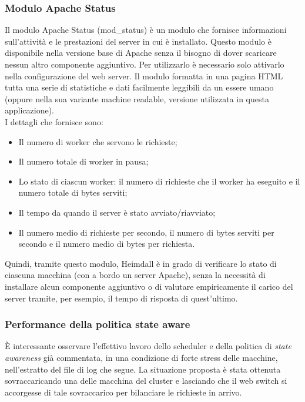 \documentclass[italian]{tktltiki2}
\begin{document}
\subsubsection{Modulo Apache Status}
\label{sssec:apachestatus}
Il modulo Apache Status (mod\_status)\cite{mod_status} è un modulo che fornisce informazioni sull'attività e le prestazioni del server in cui è installato. Questo modulo è disponibile nella versione base di Apache senza il bisogno di dover scaricare nessun altro componente aggiuntivo. Per utilizzarlo è necessario solo attivarlo nella configurazione del web server. Il modulo formatta in una pagina HTML tutta una serie di statistiche e dati facilmente leggibili da un essere umano (oppure nella sua variante machine readable, versione utilizzata in questa applicazione).
\\
I dettagli che fornisce sono:

\begin{itemize}
  \item Il numero di worker che servono le richieste;
  \item Il numero totale di worker in pausa;
  \item Lo stato di ciascun worker: il numero di richieste che il worker ha eseguito e il numero totale di bytes serviti;
  \item Il tempo da quando il server è stato avviato/riavviato;
  \item Il numero medio di richieste per secondo, il numero di bytes serviti per secondo e il numero medio di bytes per richiesta.
\end{itemize}

Quindi, tramite questo modulo, Heimdall è in grado di verificare lo stato di ciascuna macchina (con a bordo un server Apache), senza la necessità di installare alcun componente aggiuntivo o di valutare empiricamente il carico del server tramite, per esempio, il tempo di risposta di quest'ultimo.

\subsubsection{Performance della politica state aware}
È interessante osservare l'effettivo lavoro dello scheduler e della politica di \emph{state awareness} già commentata, in una condizione di forte stress delle macchine, nell'estratto del file di log che segue. La situazione proposta è stata ottenuta sovraccaricando una delle macchina del cluster e lasciando che il web switch si accorgesse di tale sovraccarico per bilanciare le richieste in arrivo.
\end{document}
